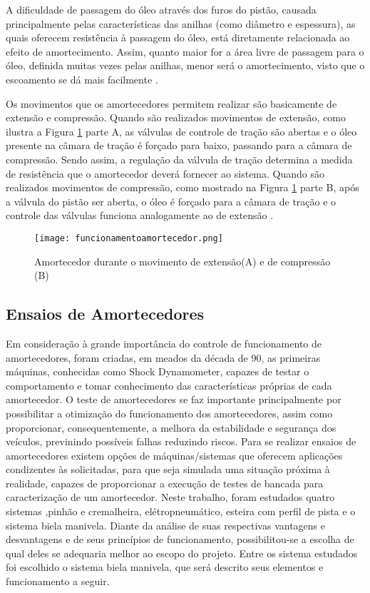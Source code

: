 			A dificuldade de passagem do óleo através dos furos do pistão, causada principalmente pelas características das anilhas (como diâmetro e espessura), as quais oferecem resistência à passagem do óleo, está diretamente relacionada ao efeito de amortecimento. Assim, quanto maior for a área livre de passagem para o óleo, definida muitas vezes pelas anilhas, menor será o amortecimento, visto que o escoamento se dá mais facilmente \cite{Duarte}.

			Os movimentos que os amortecedores permitem realizar são basicamente de extensão e compressão. Quando são realizados movimentos de extensão, como ilustra a Figura \ref{funcionamentoamortecedor} parte A, as válvulas de controle de tração são abertas e o óleo presente na câmara de tração é forçado para baixo, passando para a câmara de compressão. Sendo assim, a regulação da válvula de tração determina a medida de resistência que o amortecedor deverá fornecer ao sistema. Quando são realizados movimentos de compressão, como mostrado na Figura \ref{funcionamentoamortecedor} parte B, após a válvula do pistão ser aberta, o óleo é forçado para a câmara de tração e o controle das válvulas funciona analogamente ao de extensão \cite{Duarte}.

			\newpage
			\begin{figure}[!h]
				\centering
				\texttt{[image: funcionamentoamortecedor.png]}
				\caption[Amortecedor durante o movimento de extensão(A) e de compressão (B)]{Amortecedor durante o movimento de extensão(A) e de compressão (B) \cite{Duarte}}
				\label{funcionamentoamortecedor}
			\end{figure}


		\subsection{Ensaios de Amortecedores}
			
			Em consideração à grande importância do controle de funcionamento de amortecedores, foram criadas, em meados da década de 90, as primeiras máquinas, conhecidas como Shock Dynamometer, capazes de testar o comportamento e tomar conhecimento das características próprias de cada amortecedor.
			O teste de amortecedores se faz importante principalmente por possibilitar a otimização do funcionamento dos amortecedores, assim como proporcionar, consequentemente, a melhora da estabilidade e segurança dos veículos, previnindo possíveis falhas  reduzindo riscos.
			Para se realizar ensaios de amortecedores existem opções de máquinas/sistemas que oferecem aplicações condizentes às solicitadas, para que seja simulada uma situação próxima à realidade, capazes de proporcionar a execução de testes de bancada para caracterização de um amortecedor. Neste trabalho, foram estudados quatro sistemas ,pinhão e cremalheira, elétropneumático, esteira com perfil de pista e o sistema biela manivela. Diante da análise de suas respectivas vantagens e desvantagens e de seus princípios de funcionamento, possibilitou-se a escolha de qual deles se adequaria melhor ao escopo do projeto. Entre os sistema estudados foi escolhido o sistema biela manivela, que será descrito seus elementos e funcionamento a seguir.


